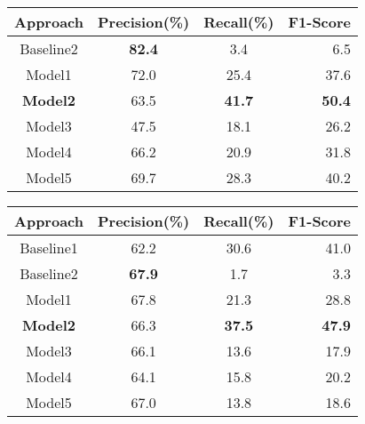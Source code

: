 \begin{table*}[t]
\centering
\parbox{.45\linewidth}{
\centering
\begin{tabular}{ | c || c | c | r | }
\hline
Approach & Precision(\%) & Recall(\%) & F1-Score\\ \hline
Baseline2 & \textbf{82.4} & 3.4 & 6.5\\ \hline
Model1 & 72.0 & 25.4 & 37.6\\ \hline
\textbf{Model2} & 63.5 & \textbf{41.7} & \textbf{50.4}\\ \hline
Model3 & 47.5 & 18.1 & 26.2\\ \hline
Model4 & 66.2 & 20.9 & 31.8\\ \hline
Model5 & 69.7 & 28.3 & 40.2\\ \hline
\end{tabular}
\caption{Predicate Identification}
\label{predidentifytable}
}
\parbox{.45\linewidth}{
\centering
\begin{tabular}{ | c || c | c | r | }
\hline
Approach & Precision(\%) & Recall(\%) & F1-Score\\ \hline
Baseline1 & 62.2 & 30.6 & 41.0\\ \hline
Baseline2 & \textbf{67.9} & 1.7 & 3.3\\ \hline
Model1 & 67.8 & 21.3 & 28.8\\ \hline
\textbf{Model2} & 66.3 & \textbf{37.5} & \textbf{47.9}\\ \hline
Model3 & 66.1 & 13.6 & 17.9\\ \hline
Model4 & 64.1 & 15.8 & 20.2\\ \hline
Model5 & 67.0 & 13.8 & 18.6\\ \hline
\end{tabular}
\caption{Argument Identification} 
\label{argidentifytable}
}
\vspace{-2.2em}
\end{table*}
